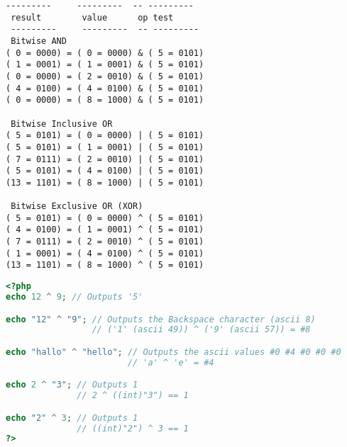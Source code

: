 \begin{verbatim}
---------     ---------  -- ---------
 result        value      op test
 ---------     ---------  -- ---------
 Bitwise AND
( 0 = 0000) = ( 0 = 0000) & ( 5 = 0101)
( 1 = 0001) = ( 1 = 0001) & ( 5 = 0101)
( 0 = 0000) = ( 2 = 0010) & ( 5 = 0101)
( 4 = 0100) = ( 4 = 0100) & ( 5 = 0101)
( 0 = 0000) = ( 8 = 1000) & ( 5 = 0101)

 Bitwise Inclusive OR
( 5 = 0101) = ( 0 = 0000) | ( 5 = 0101)
( 5 = 0101) = ( 1 = 0001) | ( 5 = 0101)
( 7 = 0111) = ( 2 = 0010) | ( 5 = 0101)
( 5 = 0101) = ( 4 = 0100) | ( 5 = 0101)
(13 = 1101) = ( 8 = 1000) | ( 5 = 0101)

 Bitwise Exclusive OR (XOR)
( 5 = 0101) = ( 0 = 0000) ^ ( 5 = 0101)
( 4 = 0100) = ( 1 = 0001) ^ ( 5 = 0101)
( 7 = 0111) = ( 2 = 0010) ^ ( 5 = 0101)
( 1 = 0001) = ( 4 = 0100) ^ ( 5 = 0101)
(13 = 1101) = ( 8 = 1000) ^ ( 5 = 0101)
\end{verbatim}


\begin{lstlisting}[language=PHP]
<?php
echo 12 ^ 9; // Outputs '5'

echo "12" ^ "9"; // Outputs the Backspace character (ascii 8)
                 // ('1' (ascii 49)) ^ ('9' (ascii 57)) = #8

echo "hallo" ^ "hello"; // Outputs the ascii values #0 #4 #0 #0 #0
                        // 'a' ^ 'e' = #4

echo 2 ^ "3"; // Outputs 1
              // 2 ^ ((int)"3") == 1

echo "2" ^ 3; // Outputs 1
              // ((int)"2") ^ 3 == 1
?>
\end{lstlisting}





